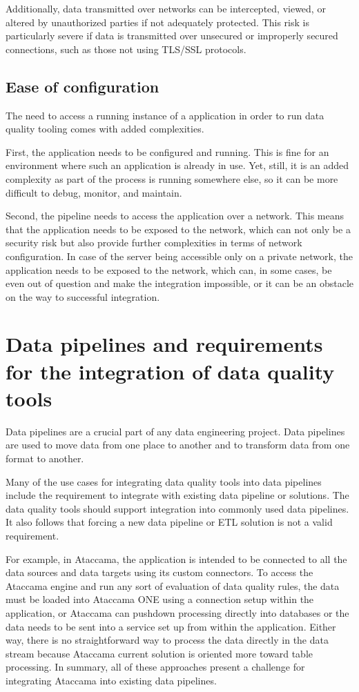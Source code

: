 Additionally, data transmitted over networks can be intercepted, viewed, or altered by unauthorized parties if not adequately protected. This risk is particularly severe if data is transmitted over unsecured or improperly secured connections, such as those not using TLS/SSL protocols. 

\subsection{Ease of configuration}

The need to access a running instance of a  application in order to run data quality tooling comes with added complexities.

First, the application needs to be configured and running. This is fine for an environment where such an application is already in use. Yet, still, it is an added complexity as part of the process is running somewhere else, so it can be more difficult to debug, monitor, and maintain.

Second, the pipeline needs to access the application over a network. This means that the application needs to be exposed to the network, which can not only be a security risk but also provide further complexities in terms of network configuration. In case of the server being accessible only on a private network, the application needs to be exposed to the network, which can, in some cases, be even out of question and make the integration impossible, or it can be an obstacle on the way to successful integration.

\section{Data pipelines and requirements for the integration of data quality tools}

Data pipelines are a crucial part of any data engineering project. Data pipelines are used to move data from one place to another and to transform data from one format to another. 

Many of the use cases for integrating data quality tools into data pipelines include the requirement to integrate with existing data pipeline or solutions. The data quality tools should support integration into commonly used data pipelines. It also follows that forcing a new data pipeline or ETL solution is not a valid requirement. 

For example, in Ataccama, the application is intended to be connected to all the data sources and data targets using its custom connectors. To access the Ataccama engine and run any sort of evaluation of data quality rules, the data must be loaded into Ataccama ONE using a connection setup within the application,  or Ataccama can pushdown processing directly into databases or the data needs to be sent into a service set up from within the application. Either way, there is no straightforward way to process the data directly in the data stream because Ataccama current solution is oriented more toward table processing. In summary, all of these approaches present a challenge for integrating Ataccama into existing data pipelines.

